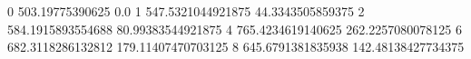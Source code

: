 0 503.19775390625 0.0
1 547.5321044921875 44.3343505859375
2 584.1915893554688 80.99383544921875
4 765.4234619140625 262.2257080078125
6 682.3118286132812 179.11407470703125
8 645.6791381835938 142.48138427734375

